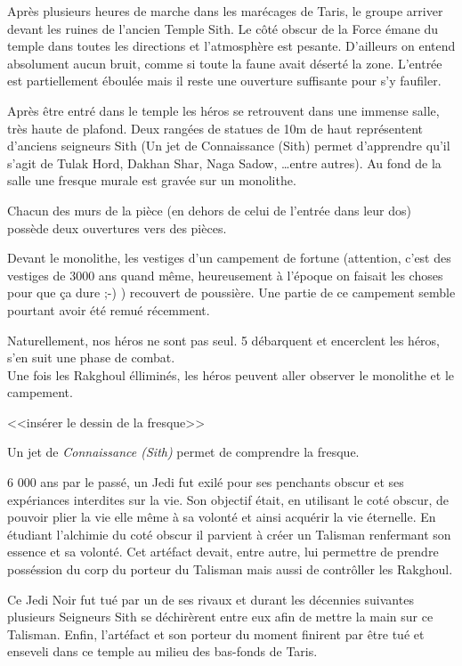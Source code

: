 Après plusieurs heures de marche dans les marécages de Taris, le groupe arriver devant les ruines de l’ancien Temple Sith. Le côté obscur de la Force émane du temple dans toutes les directions et l’atmosphère est pesante. D’ailleurs on entend absolument aucun bruit, comme si toute la faune avait déserté la zone. L’entrée est partiellement éboulée mais il reste une ouverture suffisante pour s’y faufiler.

Après être entré dans le temple les héros se retrouvent dans une immense salle, très haute de plafond. Deux rangées de statues de 10m de haut représentent d’anciens seigneurs Sith (Un jet de Connaissance (Sith) permet d’apprendre qu’il s’agit de Tulak Hord, Dakhan Shar, Naga Sadow, \ldots entre autres). Au fond de la salle une fresque murale est gravée sur un monolithe.

Chacun des murs de la pièce (en dehors de celui de l’entrée dans leur dos) possède deux ouvertures vers des pièces.

Devant le monolithe, les vestiges d’un campement de fortune (attention, c’est des vestiges de 3000 ans quand même, heureusement à l’époque on faisait les choses pour que ça dure ;-) ) recouvert de poussière. Une partie de ce campement semble pourtant avoir été remué récemment.

Naturellement, nos héros ne sont pas seul. 5  débarquent et encerclent les héros, s’en suit une phase de combat.
\\

Une fois les Rakghoul élliminés, les héros peuvent aller observer le monolithe et le campement.

<<insérer le dessin de la fresque>>

Un jet de \emph{Connaissance (Sith)} permet de comprendre la fresque. 

\begin{quotebox}
6 000 ans par le passé, un Jedi fut exilé pour ses penchants obscur et ses expériances interdites sur la vie. Son objectif était, en utilisant le coté obscur, de pouvoir plier la vie elle même à sa volonté et ainsi acquérir la vie éternelle. En étudiant l’alchimie du coté obscur il parvient à créer un Talisman renfermant son essence et sa volonté. Cet artéfact devait, entre autre, lui permettre de prendre posséssion du corp du porteur du Talisman mais aussi de contrôller les Rakghoul.

Ce Jedi Noir fut tué par un de ses rivaux et durant les décennies suivantes plusieurs Seigneurs Sith se déchirèrent entre eux afin de mettre la main sur ce Talisman. Enfin, l’artéfact et son porteur du moment finirent par être tué et enseveli dans ce temple au milieu des bas-fonds de Taris.
\end{quotebox}

